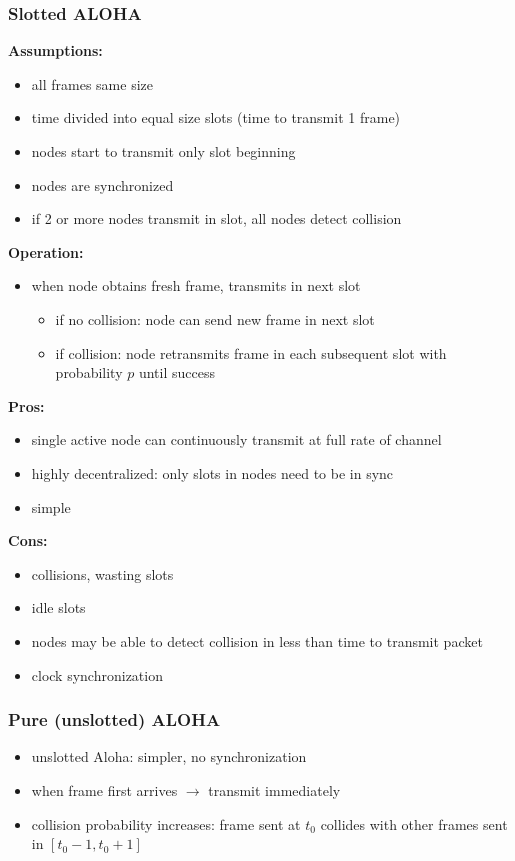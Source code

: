 \subsubsection{Slotted ALOHA}\label{sec:saloha}
\textbf{Assumptions:}
\begin{itemize}
	\item all frames same size
	\item time divided into equal size slots (time to transmit 1 frame)
	\item nodes start to transmit only slot beginning
	\item nodes are synchronized
	\item if 2 or more nodes transmit in slot, all nodes detect collision
\end{itemize}
\textbf{Operation:}
\begin{itemize}
	\item when node obtains fresh frame, transmits in next slot
	\begin{itemize}
		\item if no collision: node can send new frame in next slot
		\item if collision: node retransmits frame in each subsequent slot with probability $p$ until success
	\end{itemize}
\end{itemize}
\textbf{Pros:}
\begin{itemize}
	\item single active node can continuously transmit at full rate of channel
	\item highly decentralized: only slots in nodes need to be in sync
	\item simple
\end{itemize}
\textbf{Cons:}
\begin{itemize}
	\item collisions, wasting slots
	\item idle slots
	\item nodes may be able to detect collision in less than time to transmit packet
	\item clock synchronization
\end{itemize}
\subsubsection{Pure (unslotted) ALOHA}\label{sec:paloha}
\begin{itemize}
	\item unslotted Aloha: simpler, no synchronization
	\item when frame first arrives $\rightarrow$ transmit immediately
	\item collision probability increases: frame sent at $t_0$ collides with other frames sent in $[t_0-1,t_0+1]$
\end{itemize}
